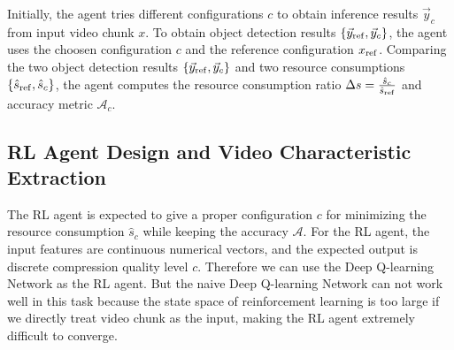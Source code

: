 Initially, the agent tries different configurations $ c $ to obtain inference results $\vec{y}_c$ from input video chunk $ x $. To obtain object detection results $ \{\vec{y}_{\rm ref}, \vec{y}_c\} $, the agent uses the choosen configuration $ c $ and the reference configuration $ x_{\rm ref} $. Comparing the two object detection results $ \{\vec{y}_{\rm ref}, \vec{y}_c\} $ and two resource consumptions $ \{\hat{s}_{\rm ref}, \hat{s}_c\} $, the agent computes the resource consumption ratio $ \Delta s = \frac{\hat{s}_c}{\hat{s}_{\rm ref}} $ and accuracy metric $ \mathcal{A}_c $.

\subsection{RL Agent Design and Video Characteristic Extraction}

The RL agent is expected to give a proper configuration $ c $ for minimizing the resource consumption $ \hat{s}_c $ while keeping the accuracy $ \mathcal{A} $. For the RL agent, the input features are continuous numerical vectors, and the expected output is discrete compression quality level $ c $. Therefore we can use the Deep Q-learning Network \cite{DQN} as the RL agent. But the naive Deep Q-learning Network can not work well in this task because the state space of reinforcement learning is too large if we directly treat video chunk as the input, making the RL agent extremely difficult to converge.  


%

